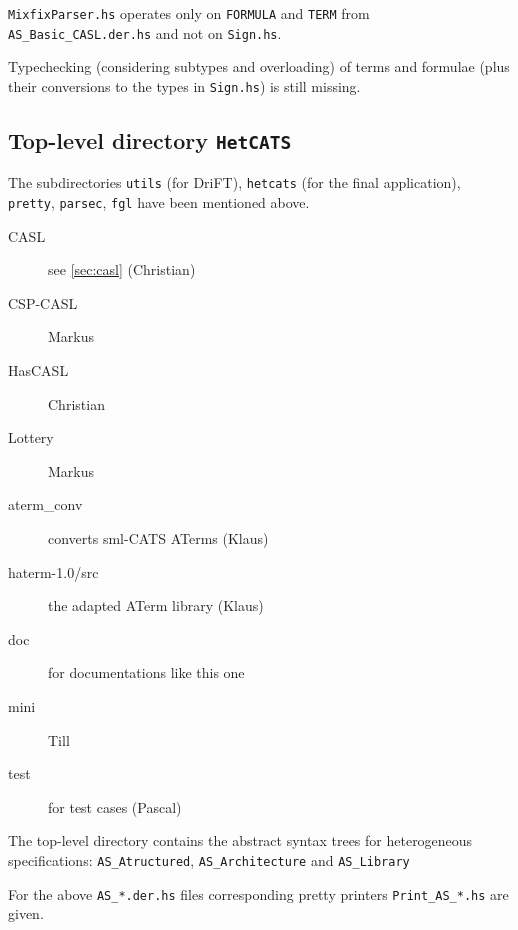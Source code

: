 \documentclass{article}
\begin{document}
\texttt{MixfixParser.hs} operates only on \texttt{FORMULA} and
\texttt{TERM} from \texttt{AS\_Basic\_CASL.der.hs} and not on
\texttt{Sign.hs}. 

Typechecking (considering subtypes and overloading) of terms and
formulae (plus their conversions to the types in \texttt{Sign.hs}) is
still missing.

\subsection{Top-level directory \texttt{HetCATS}}

The subdirectories \texttt{utils} (for DriFT), \texttt{hetcats} (for
the final application), \texttt{pretty}, \texttt{parsec}, \texttt{fgl}
have been mentioned above.

\begin{description}
\item[CASL] see \ref{sec:casl} (Christian)
\item[CSP-CASL] Markus
\item[HasCASL] Christian
\item[Lottery] Markus
\item[aterm\_conv] converts sml-CATS ATerms (Klaus)
\item[haterm-1.0/src] the adapted ATerm library (Klaus)
\item[doc] for documentations like this one
\item[mini] Till
\item[test] for test cases (Pascal)
\end{description}

The top-level directory contains the abstract syntax trees for
heterogeneous specifications: \texttt{AS\_Atructured}, \texttt{AS\_Architecture} and \texttt{AS\_Library}

For the above \texttt{AS\_*.der.hs} files corresponding pretty
printers \texttt{Print\_AS\_*.hs} are given. 
\end{document}
